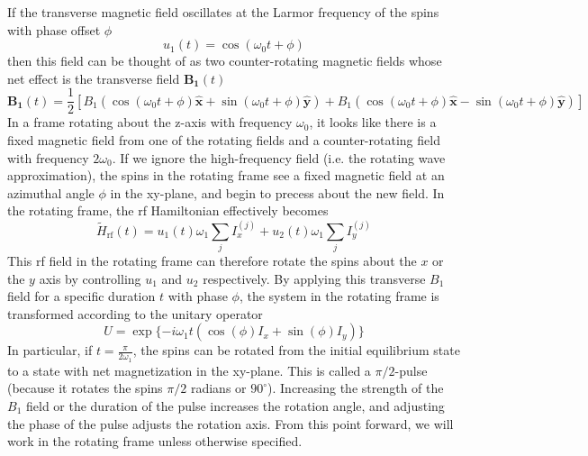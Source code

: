 If the transverse magnetic field oscillates at the Larmor frequency of the spins with phase offset $\phi$
\[
u_1(t) = \cos(\omega_0 t + \phi)
\]
then this field can be thought of as two counter-rotating magnetic fields whose net effect is the transverse field $\mathbf{B_1}(t)$
\[
\mathbf{B_1}(t) = \frac{1}{2} \left[
    B_1 (\cos(\omega_0 t + \phi) \mathbf{\hat{x}} + \sin(\omega_0 t + \phi) \mathbf{\hat{y}}) +
    B_1 (\cos(\omega_0 t + \phi) \mathbf{\hat{x}} - \sin(\omega_0 t + \phi) \mathbf{\hat{y}})
\right]
\]
%
%
In a frame rotating about the z-axis with frequency $\omega_0$, it looks like there is a fixed magnetic field from one of the rotating fields and a counter-rotating field with frequency $2\omega_0$. If we ignore the high-frequency field (i.e. the rotating wave approximation), the spins in the rotating frame see a fixed magnetic field at an azimuthal angle $\phi$ in the xy-plane, and begin to precess about the new field.
In the rotating frame, the rf Hamiltonian effectively becomes
\begin{equation}\label{eq:nmr-ham-rf-rotating}
    \widetilde{H}_\text{rf}(t) = u_1(t) \omega_1 \sum_j I_x^{(j)} + u_2(t) \omega_1 \sum_j I_y^{(j)}
\end{equation}
This rf field in the rotating frame can therefore rotate the spins about the $x$ or the $y$ axis by controlling $u_1$ and $u_2$ respectively.
By applying this transverse $B_1$ field for a specific duration $t$ with phase $\phi$, the system in the rotating frame is transformed according to the unitary operator
\[
U = \exp\{-i \omega_1 t (\cos(\phi) I_x + \sin(\phi) I_y)\}
\]
In particular, if $t = \frac{\pi}{2 \omega_1}$, the spins can be rotated from the initial equilibrium state to a state with net magnetization in the xy-plane. This is called a $\pi/2$-pulse (because it rotates the spins $\pi/2$ radians or $90^\circ$). Increasing the strength of the $B_1$ field or the duration of the pulse increases the rotation angle, and adjusting the phase of the pulse adjusts the rotation axis.
From this point forward, we will work in the rotating frame unless otherwise specified.

